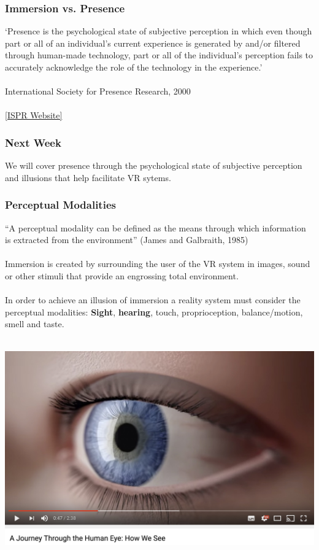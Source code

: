 \begin{frame}
	\frametitle{Immersion vs. Presence}
	
	`Presence is the psychological state of subjective perception in which even though part or all of an individual's current experience is generated by and/or filtered through human-made technology, part or all of the individual's perception fails to accurately acknowledge the role of the technology in the experience.' \\~\\
	
	International Society for Presence Research, 2000
	\\~\\
	\href{http://ispr.info}{[ISPR Website]}	
	
\end{frame}

\begin{frame}
	\frametitle{Next Week}
	We will cover presence through the psychological state of subjective perception and illusions that help facilitate VR sytems.
\end{frame}

\begin{frame}
	\frametitle{Perceptual Modalities}
	
	``A perceptual modality can be defined as the means through which information is extracted from the environment'' (James and Galbraith, 1985) \\~\\
	
	Immersion is created by surrounding the user of the VR system in images, sound or other stimuli that provide an engrossing total environment. \\~\\
	In order to achieve an illusion of immersion a reality system must consider the perceptual modalities: \textbf{Sight}, \textbf{hearing}, touch, proprioception, balance/motion, smell and taste. \\~\\
	
\end{frame}

\begin{frame}
	\begin{center}
		\href{https://www.youtube.com/watch?v=gvozcv8pS3c}{ \includegraphics[scale=.3]{assets/eyetut}  }
	\end{center}
\end{frame}

